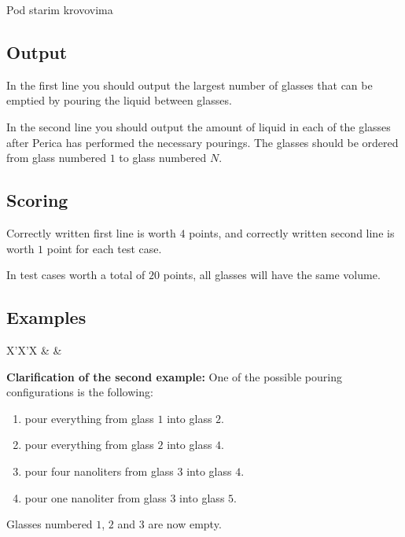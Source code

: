 \begin{statement}[
  problempoints=50,
  timelimit=1 second,
  memorylimit=512 MiB,
]{Pod starim krovovima}
\subsection*{Output}
In the first line you should output the largest number of glasses that
can be emptied by pouring the liquid between glasses.

In the second line you should output the amount of liquid in each of the
glasses after Perica has performed the necessary pourings. The glasses should
be ordered from glass numbered $1$ to glass numbered $N$.

\subsection*{Scoring}
Correctly written first line is worth $4$ points, and correctly written second
line is worth $1$ point for each test case.

In test cases worth a total of $20$ points, all glasses will have the same
volume.

\subsection*{Examples}
\begin{tabularx}{\textwidth}{X'X'X}
 &
 &
\end{tabularx}

\textbf{Clarification of the second example:}
One of the possible pouring configurations is the following:
\begin{enumerate}
  \item pour everything from glass $1$ into glass $2$.
  \item pour everything from glass $2$ into glass $4$.
  \item pour four nanoliters from glass $3$ into glass $4$.
  \item pour one nanoliter from glass $3$ into glass $5$.
\end{enumerate}
Glasses numbered $1$, $2$ and $3$ are now empty.

\end{statement}


